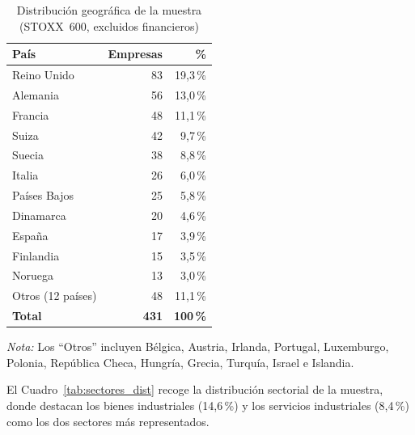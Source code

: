 \documentclass[12pt, a4paper]{article}
\begin{document}
\begin{table}[H]
  \centering
  \caption{Distribuci\'on geogr\'afica de la muestra (STOXX~600, excluidos financieros)}
  \label{tab:paises}
  \begin{tabular}{lrr}
    \toprule
    Pa\'is & Empresas & \% \\
    \midrule
    Reino Unido     & 83  & 19{,}3\,\% \\
    Alemania        & 56  & 13{,}0\,\% \\
    Francia         & 48  & 11{,}1\,\% \\
    Suiza           & 42  & 9{,}7\,\% \\
    Suecia          & 38  & 8{,}8\,\% \\
    Italia          & 26  & 6{,}0\,\% \\
    Pa\'ises Bajos  & 25  & 5{,}8\,\% \\
    Dinamarca       & 20  & 4{,}6\,\% \\
    Espa\~na        & 17  & 3{,}9\,\% \\
    Finlandia       & 15  & 3{,}5\,\% \\
    Noruega         & 13  & 3{,}0\,\% \\
    Otros (12 pa\'ises) & 48 & 11{,}1\,\% \\
    \midrule
    \textbf{Total}  & \textbf{431} & \textbf{100\,\%} \\
    \bottomrule
  \end{tabular}
  \begin{minipage}{\linewidth}
    \small\vspace{0.3em}
    \textit{Nota:} Los ``Otros'' incluyen Bélgica, Austria, Irlanda, Portugal, Luxemburgo,
    Polonia, Rep\'ublica Checa, Hungr\'ia, Grecia, Turqu\'ia, Israel e Islandia.
  \end{minipage}
\end{table}

El Cuadro~\ref{tab:sectores_dist} recoge la distribuci\'on sectorial de la muestra,
donde destacan los bienes industriales (14,6\,\%) y los servicios industriales (8,4\,\%)
como los dos sectores m\'as representados.
\end{document}

